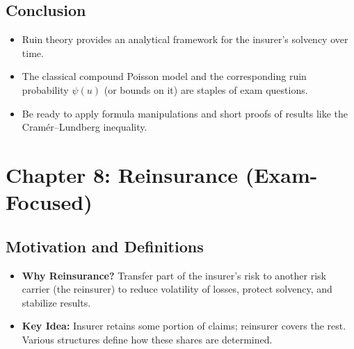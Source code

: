 \documentclass[13pt,a4paper]{article}
\begin{document}
\subsection{Conclusion}
\begin{itemize}
  \item Ruin theory provides an analytical framework for the insurer’s solvency over time.
  \item The classical compound Poisson model and the corresponding ruin probability \(\psi(u)\) (or bounds on it) are staples of exam questions.
  \item Be ready to apply formula manipulations and short proofs of results like the Cram\'er--Lundberg inequality.
\end{itemize}

\section{Chapter 8: Reinsurance (Exam-Focused)}
\label{sec:chapter8}

\subsection{Motivation and Definitions}
\begin{itemize}
  \item \textbf{Why Reinsurance?} Transfer part of the insurer’s risk to another risk carrier (the reinsurer) to reduce volatility of losses, protect solvency, and stabilize results.
  \item \textbf{Key Idea:} Insurer retains some portion of claims; reinsurer covers the rest. Various structures define how these shares are determined.
\end{itemize}
\end{document}

